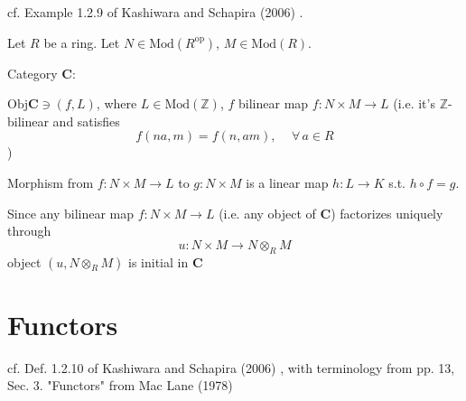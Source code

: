 cf. Example 1.2.9 of Kashiwara and Schapira (2006) \cite{agat:KaSch2006}. 

Let $R$ be a ring. Let $N\in \text{Mod}(R^{\text{op}})$, $M\in \text{Mod}(R)$.

Category $\mathbf{C}$: 

$\text{Obj}\mathbf{C} \ni (f, L)$, where $L\in \text{Mod}(\mathbb{Z})$, $f$ bilinear map $f: N \times M \to L$ (i.e. it's $\mathbb{Z}$-bilinear and satisfies
\[
f(na, m) = f(n,am), \quad \, \forall \, a \in R
\])

Morphism from $f:N \times M \to L$ to $g: N\times M$ is a linear map $h:L\to K$ s.t. $h\circ f =g$. 

Since any bilinear map $f: N\times M \to L$ (i.e. any object of $\mathbf{C}$) factorizes uniquely through
\[
u  : N\times M \to N \otimes_R M
\]
object $(u, N \otimes_R M)$ is initial in $\mathbf{C}$

\section{Functors}

cf. Def. 1.2.10 of Kashiwara and Schapira (2006) \cite{agat:KaSch2006}, with terminology from pp. 13, Sec. 3. "Functors" from Mac Lane (1978) \cite{agat:MacL1978}

